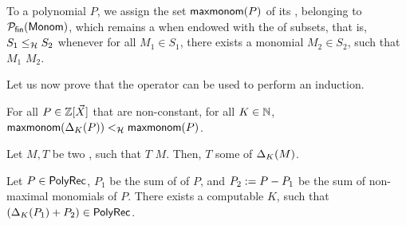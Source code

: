\documentclass[sigconf,natbib=false,screen, review,anonymous]{acmart}
\begin{document}
\AP To a polynomial $P$, we assign the set $\mathop{\mathsf{maxmonom}}(P)$ of its
, belonging to $\Pfin(\Monomials)$, which remains a
 when endowed with the  of
subsets, that is, $S_1 \leq_{\mathcal{H}} S_2$ whenever for all  $M_1 \in
S_1$, there exists a monomial $M_2 \in S_2$, such that $M_1$ 
$M_2$.

Let us now prove that the  operator
can be used to perform an induction.

\begin{fact}
    \label{derivation-simplifies:fact}
    For all $P \in \mathbb{Z}[\vec{X}]$ that are non-constant,
    for all $K \in \mathbb{N}$,
    $\mathop{\mathsf{maxmonom}}(\Delta_{K}(P)) <_{\mathcal{H}}
    \mathop{\mathsf{maxmonom}}(P)$.
\end{fact}

\begin{fact}
    Let $M,T$ be two , such that
    $T$  $M$.
    Then,
    $T$  some 
    of $\Delta_{K}(M)$.
\end{fact}


\begin{lemma}
    \label{derivation-stabilises-correct:lem}
    Let $P \in \mathsf{PolyRec}$,
    $P_1$ be the sum of  of $P$,
    and $P_2 \mathrel{:=} P - P_1$ be the sum of
    non-maximal monomials of $P$.
    There exists a computable $K$,
    such that
    $(\Delta_{K}(P_1) + P_2) \in \mathsf{PolyRec}$.
\end{lemma}
\end{document}
